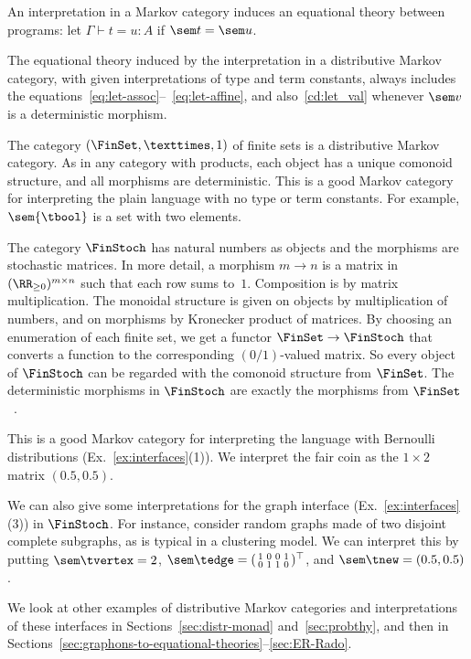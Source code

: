 An interpretation in a Markov category induces an equational theory
between programs: let $\Gamma\vdash t=u :A$ if $\sem t=\sem u$.
\begin{proposition}
The equational theory induced by the interpretation in a distributive Markov
category, with given interpretations of type and term constants,
always includes the
equations~\eqref{eq:let-assoc}--~\eqref{eq:let-affine}, 
and also~\eqref{cd:let_val} whenever $\sem v$ is a deterministic morphism. 
\end{proposition}
\begin{example}\label{ex:finset}
  The category $(\FinSet, ×, 1)$ of finite sets is a distributive Markov
    category. As in any category with products, each object has a
    unique comonoid structure, and all morphisms are deterministic. 
    This is a good Markov category for interpreting the plain language
    with no type or term constants. For example, $\sem{\tbool}$ is a
    set with two elements. 
  \end{example}\begin{example}\label{ex:finstoch} The category $\FinStoch$ has natural numbers as objects and
    the morphisms are stochastic matrices. In more detail, a morphism $m\to
    n$ is a matrix in $(\RR_{\geq 0})^{m\times n}$ such that each row sums
    to~$1$.
    Composition is by matrix multiplication. The monoidal structure is
    given on objects by multiplication of numbers, and on morphisms by
    Kronecker product of matrices.
    By choosing an enumeration of each finite set, we get a functor $\FinSet\to\FinStoch$ that converts a function to the corresponding
    $(0/1)$-valued matrix. So every object of $\FinStoch$ can be
    regarded with the comonoid structure from $\FinSet$. 
    The deterministic morphisms in
    $\FinStoch$ are exactly the morphisms from $\FinSet$~\cite[10.3]{fritz}. 

    This is a good Markov category for interpreting the language with
    Bernoulli distributions (Ex.~\ref{ex:interfaces}(1)). We
    interpret the fair coin as the $1\times 2$ matrix $(0.5,0.5)$.

    We can also give some interpretations for the graph interface (Ex.~\ref{ex:interfaces}(3)) in $\FinStoch$.
    For instance, consider random graphs made of two disjoint complete subgraphs,
    as is typical in a clustering model.
    We can interpret this by putting $\sem\tvertex =2$,
    $\sem\tedge=(\begin{smallmatrix}1&0&0&1
      \\0&1&1&0\end{smallmatrix})^\top$, and $\sem\tnew=(0.5,0.5)$.
\end{example}
We look at other examples of distributive Markov categories and
interpretations of these interfaces in
Sections~\ref{sec:distr-monad} and~\ref{sec:probthy}, and then in Sections~\ref{sec:graphons-to-equational-theories}--\ref{sec:ER-Rado}. 


